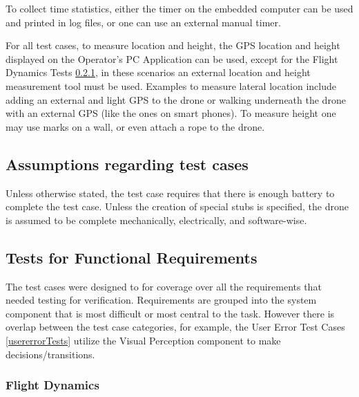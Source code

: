 \documentclass[12pt, titlepage]{article}
\begin{document}
To collect time statistics, either the timer on the embedded computer can be used and printed in log files, or one can use an external manual timer.

For all test cases, to measure location and height, the GPS location and height displayed on the Operator's PC Application can be used, except for the Flight Dynamics Tests \ref{flightdynamicsTests}, in these scenarios an external location and height measurement tool must be used. Examples to measure lateral location include adding an external and light GPS to the drone or walking underneath the drone with an external GPS (like the ones on smart phones). To measure height one may use marks on a wall, or even attach a rope to the drone.

\subsection{Assumptions regarding test cases}
Unless otherwise stated, the test case requires that there is enough battery to complete the test case.
Unless the creation of special stubs is specified, the drone is assumed to be complete mechanically, electrically, and software-wise. 

\subsection{Tests for Functional Requirements}

The test cases were designed to for coverage over all the requirements that needed testing for verification. Requirements are grouped into the system component that is most difficult or most central to the task. However there is overlap between the test case categories, for example, the User Error Test Cases \ref{usererrorTests} utilize the Visual Perception component to make decisions/transitions.

\subsubsection{Flight Dynamics}
\label{flightdynamicsTests}
\end{document}
